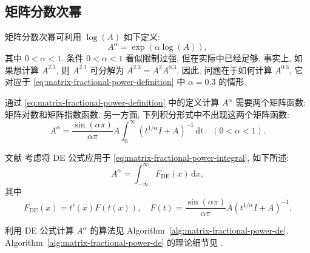 \subsection{{矩阵分数次幂}}\label{sec:matrix-fractional-power}

{矩阵分数次幂可利用 $\log(A)$ 如下定义:}
\begin{equation}\label{eq:matrix-fractional-power-definition}A^\alpha=\exp(\alpha\log(A)),\end{equation}
{其中 $0<\alpha<1$. 条件 $0<\alpha<1$ 看似限制过强, 但在实际中已经足够. 事实上, 如果想计算 $A^{2.3}$, 则 $A^{2.3}$ 可分解为 $A^{2.3}=A^2A^{0.3}$. 因此, 问题在于如何计算 $A^{0.3}$, 它对应于 \eqref{eq:matrix-fractional-power-definition} 中 $\alpha=0.3$ 的情形.}

{通过 \eqref{eq:matrix-fractional-power-definition} 中的定义计算 $A^\alpha$ 需要两个矩阵函数: 矩阵对数和矩阵指数函数. 另一方面, 下列积分形式中不出现这两个矩阵函数:}
\begin{equation}\label{eq:matrix-fractional-power-integral}A^\alpha=\frac{\sin(\alpha\pi)}{\alpha\pi}A\int_0^\infty(t^{1/\alpha}I+A)^{-1}\,\mathrm{d}t\quad(0<\alpha<1).\end{equation}

{文献  考虑将 DE 公式应用于 \eqref{eq:matrix-fractional-power-integral}, 如下所述:}
\begin{equation}\label{eq:matrix-fractional-power-de-integral}A^\alpha=\int_{-\infty}^\infty F_{\mathrm{DE}}(x)\,\mathrm{d}x,\end{equation}
{其中}
\begin{equation}\label{eq:matrix-fractional-power-de-integrand}F_{\mathrm{DE}}(x)=t'(x)F(t(x)),\quad F(t)=\frac{\sin(\alpha\pi)}{\alpha\pi}A(t^{1/\alpha}I+A)^{-1}.\end{equation}

{利用 DE 公式计算 $A^\alpha$ 的算法见 Algorithm~\ref{alg:matrix-fractional-power-de}. Algorithm~\ref{alg:matrix-fractional-power-de} 的理论细节见 .}

